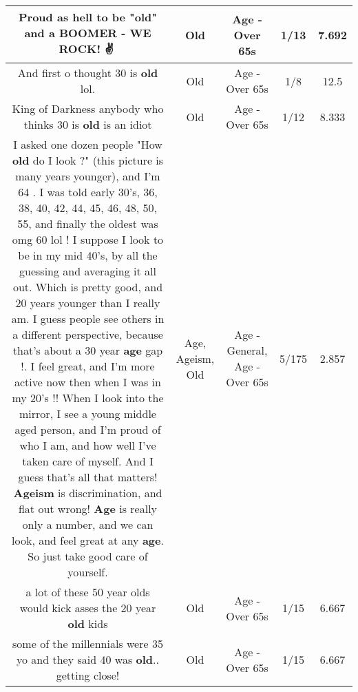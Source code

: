 \documentclass[11pt]{article}
\newlength\mylength
\begin{document}
\begin{center}
\begin{longtable}{|C{.65\mylength}|C{.30\mylength}|C{.12\mylength}|C{.12\mylength}|C{.12\mylength}|}
  \small Proud as hell to be "\textbf{old}" and a BOOMER - WE ROCK! ✌💪\normalsize   & Old & Age - Over 65s & 1/13 & 7.692 \\  \hline
  \small And first o thought 30 is \textbf{old} lol.\normalsize   & Old & Age - Over 65s & 1/8 & 12.5 \\  \hline
  \small King of Darkness anybody who thinks 30 is \textbf{old} is an idiot\normalsize   & Old & Age - Over 65s & 1/12 & 8.333 \\  \hline
  \small I asked one dozen people "How \textbf{old} do I look ?" (this picture is many years younger), and I'm 64 . I was told early  30's, 36, 38, 40, 42, 44, 45, 46, 48, 50, 55, and finally the oldest was omg 60 lol ! I suppose I look to be in my mid 40's, by all the guessing and averaging it all out. Which is pretty good, and 20 years younger than I really am. I guess people see others in a different perspective, because that's about a 30 year \textbf{age} gap !. I feel great, and I'm more active now then when I was in my 20's !! When I look into the mirror, I see a young middle aged person, and I'm proud of who I am, and how well I've taken care of myself. And I guess that's all that matters! \textbf{Ageism} is discrimination, and flat out wrong! \textbf{Age} is really only a number, and we can look, and feel great at any \textbf{age}. So just take good care of yourself.\normalsize   & Age, Ageism, Old & Age - General, Age - Over 65s & 5/175 & 2.857 \\  \hline
  \small a lot of these 50 year olds would kick asses the 20 year \textbf{old} kids\normalsize   & Old & Age - Over 65s & 1/15 & 6.667 \\  \hline
  \small some of the millennials were 35 yo and they said 40 was \textbf{old}.. getting close!\normalsize   & Old & Age - Over 65s & 1/15 & 6.667 \\  \hline

\end{longtable}
\end{center}
\end{document}
